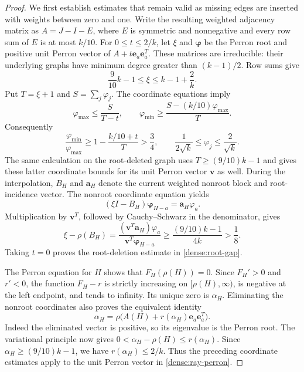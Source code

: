 \documentclass[11pt,a4paper]{article}
\numberwithin{equation}{section}
\theoremstyle{definition}
\theoremstyle{remark}
\begin{document}
\begin{proof}
We first establish estimates that remain valid as missing edges are
inserted with weights between zero and one.  Write the resulting
weighted adjacency matrix as $A=J-I-E$, where $E$ is symmetric and
nonnegative and every row sum of $E$ is at most $k/10$.
For $0\le t\le2/k$, let $\xi$ and $\boldsymbol\varphi$ be the Perron
root and positive unit Perron vector of
$A+t\mathbf e_a\mathbf e_a^T$.  These matrices are irreducible:
their underlying graphs have minimum degree greater than
$(k-1)/2$.  Row sums give
\[
 \frac9{10}k-1\le\xi\le k-1+\frac2k.
\]
Put $T=\xi+1$ and $S=\sum_j\varphi_j$.  The coordinate equations imply
\[
 \varphi_{\max}\le\frac{S}{T-t},
 \qquad
 \varphi_{\min}\ge\frac{S-(k/10)\varphi_{\max}}{T}.
\]
Consequently
\begin{equation}\label{dense:coordinates}
 \frac{\varphi_{\min}}{\varphi_{\max}}
 \ge 1-\frac{k/10+t}{T}>\frac34,
 \qquad
 \frac1{2\sqrt{k}}\le\varphi_j\le\frac2{\sqrt{k}}.
\end{equation}
The same calculation on the root-deleted graph uses
$T\ge(9/10)k-1$ and gives these latter coordinate bounds for its
unit Perron vector $\mathbf v$ as well.
During the interpolation, $B_H$ and $\mathbf a_H$ denote the current
weighted nonroot block and root-incidence vector.  The nonroot
coordinate equation yields
\[
 (\xi I-B_H)\boldsymbol\varphi_{H-a}
   =\mathbf a_H\varphi_a.
\]
Multiplication by $\mathbf v^T$, followed by Cauchy--Schwarz in the
denominator, gives
\[
 \xi-\rho(B_H)
 =\frac{(\mathbf v^T\mathbf a_H)\varphi_a}
        {\mathbf v^T\boldsymbol\varphi_{H-a}}
 \ge\frac{(9/10)k-1}{4k}>\frac18.
\]
Taking $t=0$ proves the root-deletion estimate in
\eqref{dense:root-gap}.

The Perron equation for $H$ shows that $F_H(\rho(H))=0$.
Since $F_H'>0$ and $r'<0$, the function $F_H-r$ is strictly increasing
on $[\rho(H),\infty)$, is negative at the left endpoint, and tends
to infinity.  Its unique zero is $\alpha_H$.  Eliminating the
nonroot coordinates also proves the equivalent identity
\begin{equation}\label{dense:ray-perron}
 \alpha_H
 =\rho\bigl(A(H)+r(\alpha_H)\mathbf e_a\mathbf e_a^T\bigr).
\end{equation}
Indeed the eliminated vector is positive, so its eigenvalue is the
Perron root.  The variational principle now gives
$0<\alpha_H-\rho(H)\le r(\alpha_H)$.
Since $\alpha_H\ge(9/10)k-1$, we have
$r(\alpha_H)\le2/k$.  Thus the preceding coordinate estimates apply
to the unit Perron vector in \eqref{dense:ray-perron}.


\end{proof}
\end{document}
